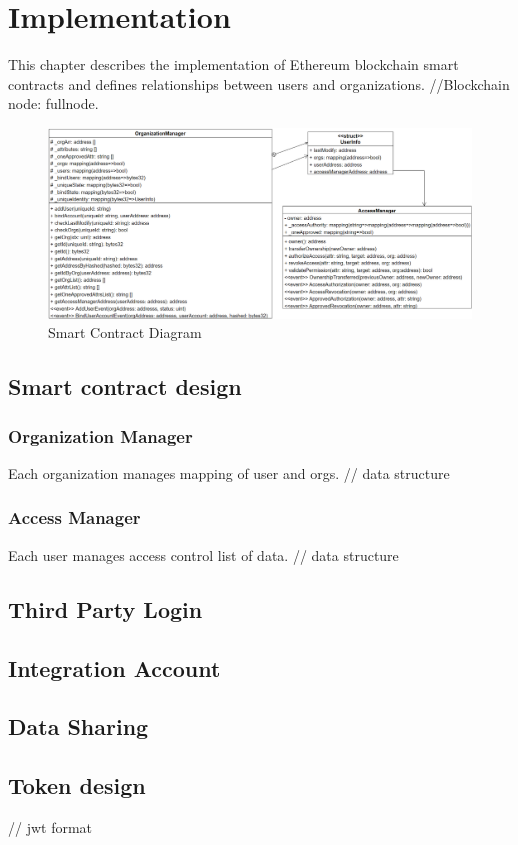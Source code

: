 \chapter{Implementation} 
\label{chapter:implementation}
This chapter describes the implementation of Ethereum blockchain smart contracts and defines relationships between users and organizations.
//Blockchain node: fullnode.

\begin{figure}[hb]
    \centering
    \includegraphics[height=!,width=1\linewidth,keepaspectratio=true]{figures/smart_contract_diagram.png}
    \caption{{\footnotesize Smart Contract Diagram}}
    \label{fig:smart_contract_diagram}
\end{figure}
\section{Smart contract design}
\subsection*{Organization Manager}
Each organization manages mapping of user and orgs.
// data structure
\subsection*{Access Manager}
Each user manages access control list of data.
// data structure

\section{Third Party Login}
\section{Integration Account}
\section{Data Sharing}
\section{Token design}
// jwt format